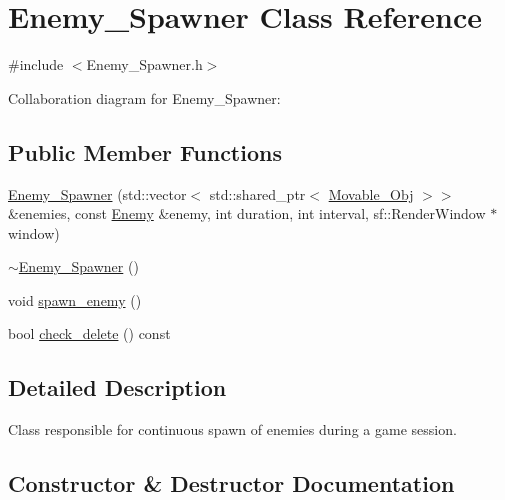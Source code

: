 \hypertarget{classEnemy__Spawner}{}\section{Enemy\+\_\+\+Spawner Class Reference}
\label{classEnemy__Spawner}


{\ttfamily \#include $<$Enemy\+\_\+\+Spawner.\+h$>$}



Collaboration diagram for Enemy\+\_\+\+Spawner\+:
\subsection*{Public Member Functions}
\begin{DoxyCompactItemize}
\item 
\hyperlink{classEnemy__Spawner_a3abd87812187ec693c497d8c47f85e23}{Enemy\+\_\+\+Spawner} (std\+::vector$<$ std\+::shared\+\_\+ptr$<$ \hyperlink{classMovable__Obj}{Movable\+\_\+\+Obj} $>$$>$ \&enemies, const \hyperlink{classEnemy}{Enemy} \&enemy, int duration, int interval, sf\+::\+Render\+Window $\ast$window)
\item 
\hyperlink{classEnemy__Spawner_a1af566e66e5cc951186873c481c3284f}{$\sim$\+Enemy\+\_\+\+Spawner} ()
\item 
void \hyperlink{classEnemy__Spawner_aea2a6ce6be37d516aff5eb8e851a9366}{spawn\+\_\+enemy} ()
\item 
bool \hyperlink{classEnemy__Spawner_a446dc39931e10562ec2dd9497e4d8b6a}{check\+\_\+delete} () const
\end{DoxyCompactItemize}


\subsection{Detailed Description}
Class responsible for continuous spawn of enemies during a game session. 

\subsection{Constructor \& Destructor Documentation}
\mbox{\label{classEnemy__Spawner_a3abd87812187ec693c497d8c47f85e23}} 
